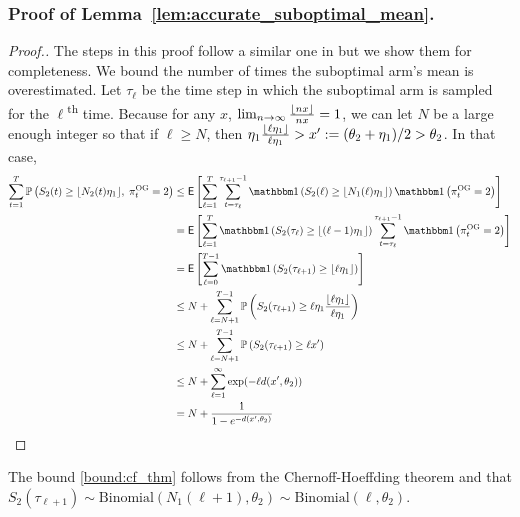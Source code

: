 \subsubsection{Proof of Lemma~\ref{lem:accurate_suboptimal_mean}.} \label{prf:proof_of_acc_sub_means}
\begin{proof}[Proof.]
	The steps in this proof follow a similar one in \cite{agrawal2013further} but we show them for completeness. We bound the number of times the suboptimal arm's mean is overestimated. Let $\tau_\ell$ be the time step in which the  suboptimal arm is sampled for the $\ell$\textsuperscript{th} time. Because for any $x$, $\lim_{n\to\infty}\frac{\lfloor nx\rfloor}{nx} = 1$, we can let $N$ be a large enough integer so that if $\ell \ge N$, then $\eta_1 \frac{\lfloor\ell \eta_1\rfloor}{\ell \eta_1} > x' := (\theta_2 + \eta_1)/2 > \theta_2$. In that case,
	\begin{align}
	\sum_{t=1}^T\P{S_2(t) \ge \floor{N_2(t) \eta_1}, \; \pi^{\rm OG}_t = 2} & \le \Ee{\sum_{\ell=1}^T \sum_{t=\tau_\ell}^{\tau_{\ell+1}-1}\ind{S_2(\ell) \ge \floor{N_1(\ell) \eta_1}} \ind{\pi^{\rm OG}_t = 2}} \nonumber \\
	& = \Ee{\sum_{\ell=1}^T \ind{S_2(\tau_{\ell}) \ge \floor{(\ell-1) \eta_1}} \sum_{t=\tau_\ell}^{\tau_{\ell+1}-1} \ind{\pi^{\rm OG}_t = 2}} \nonumber\\
	& = \Ee{\sum_{\ell=0}^{T-1} \ind{S_2(\tau_{\ell+1}) \ge \floor{\ell \eta_1}}} \nonumber\\
	& \le  N + \sum_{\ell=N+1}^{T-1} \P{ S_2(\tau_{\ell+1}) \ge \ell \eta_1 \frac{\floor{\ell \eta_1}}{\ell \eta_1}} \nonumber \\
	& \le N + \sum_{\ell=N+1}^{T-1} \P{ S_2(\tau_{\ell+1}) \ge \ell x'} \nonumber \\
	& \le  N + \sum_{\ell=1}^{\infty} \exp(-\ell d(x', \theta_2)) \label{bound:cf_thm} \\
	& = N + \frac{1}{1 - e^{-d(x',\theta_2)}} \nonumber
	\end{align}
\end{proof}
The bound \eqref{bound:cf_thm} follows from the Chernoff-Hoeffding theorem and that $S_2(\tau_{\ell+1}) \sim \text{Binomial}(N_1(\ell+1), \theta_2) \sim \text{Binomial}(\ell, \theta_2)$.